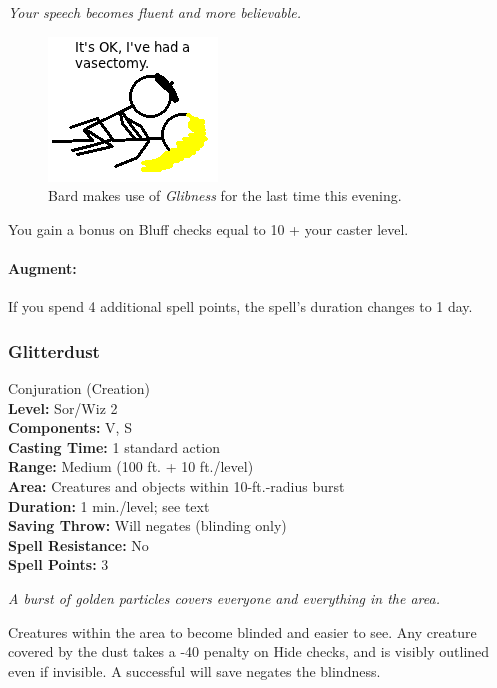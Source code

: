 \emph{Your speech becomes fluent and more believable.} 

\begin{figure}
  \caption{Bard makes use of \emph{Glibness} for the last time this evening.}
  \centering
    \includegraphics{Pics/Glibness.png}
\end{figure}

You gain a bonus on Bluff checks equal to 10 + your caster level.

\paragraph{Augment:} If you spend 4 additional spell points, the spell's duration changes to 1 day.
\subsubsection{Glitterdust}
\label{Spell:Glitterdust}
Conjuration (Creation)
\\ \textbf{Level:} Sor/Wiz 2
\\ \textbf{Components:} V, S
\\ \textbf{Casting Time:} 1 standard action
\\ \textbf{Range:} Medium (100 ft. + 10 ft./level)
\\ \textbf{Area:} Creatures and objects within 10-ft.-radius burst
\\ \textbf{Duration:} 1 min./level; see text
\\ \textbf{Saving Throw:} Will negates (blinding only)
\\ \textbf{Spell Resistance:} No
\\ \textbf{Spell Points:} 3

\emph{A burst of golden particles covers everyone and everything in the area.} 

Creatures within the area to become blinded and easier to see. 
Any creature covered by the dust takes a -40 penalty on Hide checks, and is visibly outlined even if invisible. A successful will save negates the blindness.

